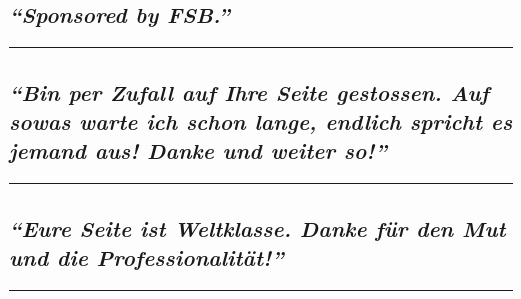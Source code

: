 \hypertarget{sponsored-by-fsb}{%
\subsection{\texorpdfstring{\emph{``Sponsored by
FSB.''}}{``Sponsored by FSB.''}}\label{sponsored-by-fsb}}

\begin{center}\rule{0.5\linewidth}{\linethickness}\end{center}

\hypertarget{bin-per-zufall-auf-ihre-seite-gestossen-auf-sowas-warte-ich-schon-lange-endlich-spricht-es-jemand-aus-danke-und-weiter-so}{%
\subsection{\texorpdfstring{\emph{``Bin per Zufall auf Ihre Seite
gestossen. Auf sowas warte ich schon lange, endlich spricht es jemand
aus! Danke und weiter
so!''}}{``Bin per Zufall auf Ihre Seite gestossen. Auf sowas warte ich schon lange, endlich spricht es jemand aus! Danke und weiter so!''}}\label{bin-per-zufall-auf-ihre-seite-gestossen-auf-sowas-warte-ich-schon-lange-endlich-spricht-es-jemand-aus-danke-und-weiter-so}}

\begin{center}\rule{0.5\linewidth}{\linethickness}\end{center}

\hypertarget{eure-seite-ist-weltklasse-danke-fuxfcr-den-mut-und-die-professionalituxe4t}{%
\subsection{\texorpdfstring{\emph{``Eure Seite ist Weltklasse. Danke für
den Mut und die
Professionalität!''}}{``Eure Seite ist Weltklasse. Danke für den Mut und die Professionalität!''}}\label{eure-seite-ist-weltklasse-danke-fuxfcr-den-mut-und-die-professionalituxe4t}}

\begin{center}\rule{0.5\linewidth}{\linethickness}\end{center}

